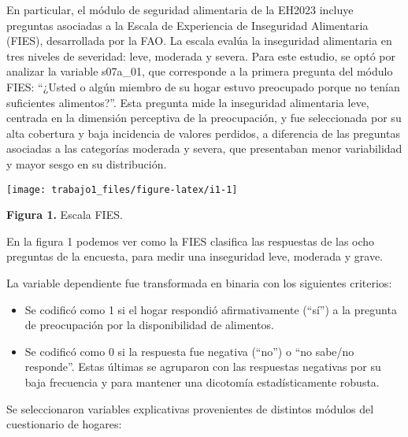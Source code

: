 \documentclass[Royal,times,sageh]{sagej}
\begin{document}
En particular, el módulo de seguridad alimentaria de la EH2023 incluye
preguntas asociadas a la Escala de Experiencia de Inseguridad
Alimentaria (FIES), desarrollada por la FAO. La escala evalúa la
inseguridad alimentaria en tres niveles de severidad: leve, moderada y
severa. Para este estudio, se optó por analizar la variable s07a\_01,
que corresponde a la primera pregunta del módulo FIES: ``¿Usted o algún
miembro de su hogar estuvo preocupado porque no tenían suficientes
alimentos?''. Esta pregunta mide la inseguridad alimentaria leve,
centrada en la dimensión perceptiva de la preocupación, y fue
seleccionada por su alta cobertura y baja incidencia de valores
perdidos, a diferencia de las preguntas asociadas a las categorías
moderada y severa, que presentaban menor variabilidad y mayor sesgo en
su distribución.

\texttt{[image: trabajo1\_files/figure-latex/i1-1]}

\begin{center}
\textbf{Figura 1.} Escala FIES.
\end{center}

En la figura 1 podemos ver como la FIES clasifica las respuestas de las
ocho preguntas de la encuesta, para medir una inseguridad leve, moderada
y grave.

La variable dependiente fue transformada en binaria con los siguientes
criterios:

\begin{itemize}
\item
  Se codificó como 1 si el hogar respondió afirmativamente (``sí'') a la
  pregunta de preocupación por la disponibilidad de alimentos.
\item
  Se codificó como 0 si la respuesta fue negativa (``no'') o ``no
  sabe/no responde''. Estas últimas se agruparon con las respuestas
  negativas por su baja frecuencia y para mantener una dicotomía
  estadísticamente robusta.
\end{itemize}

Se seleccionaron variables explicativas provenientes de distintos
módulos del cuestionario de hogares:
\end{document}
